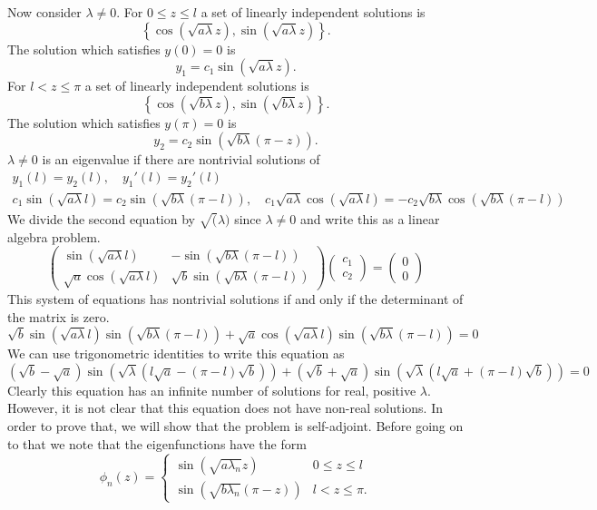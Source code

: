 {\begin{Solution}
  Now consider $\lambda \neq 0$.  For $0 \leq z \leq l$ a set of linearly
  independent solutions is
  \[
  \left\{ \cos( \sqrt{a \lambda} z ), \sin( \sqrt{a \lambda} z ) \right\}.
  \]
  The solution which satisfies $y(0) = 0$ is
  \[
  y_1 = c_1 \sin( \sqrt{a \lambda} z ).
  \]
  For $l < z \leq \pi$ a set of linearly
  independent solutions is
  \[
  \left\{ \cos( \sqrt{b \lambda} z ), \sin( \sqrt{b \lambda} z ) \right\}.
  \]
  The solution which satisfies $y(\pi) = 0$ is
  \[
  y_2 = c_2 \sin( \sqrt{b \lambda} (\pi - z) ).
  \]
  $\lambda \neq 0$ is an eigenvalue if there are nontrivial solutions of
  \begin{gather*}
    y_1(l) = y_2(l), \quad y_1'(l) = y_2'(l) \\
    c_1 \sin( \sqrt{a \lambda} l ) = c_2 \sin( \sqrt{b \lambda} (\pi - l) ), \quad
    c_1 \sqrt{a \lambda} \cos( \sqrt{a \lambda} l ) 
    = - c_2 \sqrt{b \lambda} \cos( \sqrt{b \lambda} (\pi - l) )
  \end{gather*}
  We divide the second equation by $\sqrt(\lambda)$ since $\lambda \neq 0$
  and write this as a linear algebra problem.
  \[
  \begin{pmatrix}
    \sin( \sqrt{a \lambda} l ) & - \sin( \sqrt{b \lambda} (\pi - l) ) \\
    \sqrt{a} \cos( \sqrt{a \lambda} l ) & 
    \sqrt{b} \sin( \sqrt{b \lambda} (\pi - l) )
  \end{pmatrix}
  \begin{pmatrix}
    c_1 \\
    c_2
  \end{pmatrix}
  =
  \begin{pmatrix}
    0 \\
    0
  \end{pmatrix}
  \]
  This system of equations has nontrivial solutions if and only if the 
  determinant of the matrix is zero.
  \[
  \sqrt{b} \sin( \sqrt{a \lambda} l ) \sin( \sqrt{b \lambda} (\pi - l) )
  + \sqrt{a} \cos( \sqrt{a \lambda} l )\sin( \sqrt{b \lambda} (\pi - l) ) = 0
  \]
  We can use trigonometric identities to write this equation as
  \[
  \boxed{
    (\sqrt{b} - \sqrt{a}) \sin \left( \sqrt{\lambda} 
      ( l \sqrt{a} - (\pi - l) \sqrt{b} ) \right)
    + (\sqrt{b} + \sqrt{a}) \sin \left( \sqrt{\lambda} 
      ( l \sqrt{a} + (\pi - l) \sqrt{b} ) \right) = 0
    }
  \]
  Clearly this equation has an infinite number of solutions for real, positive
  $\lambda$.  However, it is not clear that this equation does not have 
  non-real solutions. In order to prove that, we will show that the 
  problem is self-adjoint.  Before going on to that we note that
  the eigenfunctions have the form
  \[
  \boxed{
    \phi_n(z) = \begin{cases}
      \sin \left(\sqrt{a \lambda_n} z \right) & 0 \leq z \leq l \\
      \sin \left(\sqrt{b \lambda_n} (\pi-z) \right) & l < z \leq \pi.
    \end{cases}
    }
  \]


\end{Solution}}
